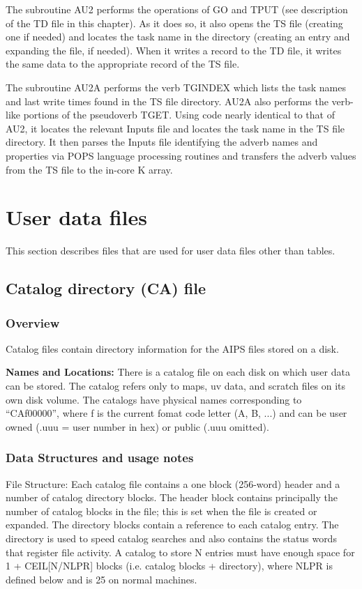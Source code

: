      The subroutine AU2 performs the operations of GO and
TPUT (see description of the TD file in this chapter).  As it does so,
it also opens the TS file (creating one if needed) and locates the
task name in the directory (creating an entry and expanding the file,
if needed).  When it writes a record to the TD file, it writes the
same data to the appropriate record of the TS file.

     The subroutine AU2A performs the verb TGINDEX which
lists the task names and last write times found in the TS file
directory.  AU2A also performs the verb-like portions of the
pseudoverb TGET.  Using code nearly identical to that of AU2, it
locates the relevant Inputs file and locates the task name in the TS
file directory.  It then parses the Inputs file identifying the adverb
names and properties via POPS language processing routines and
transfers the adverb values from the TS file to the in-core K array.
\section{User data files}
   This section describes files that are used for user data files
other than tables.

\subsection{Catalog directory (CA) file}
\subsubsection{ Overview}


  Catalog files contain directory information for the
     AIPS files stored on a disk.

{\bf Names and Locations:} There is a catalog file on each disk on
which user data can be stored.  The catalog refers only to maps, uv data,
and scratch
files on its own disk volume.  The catalogs have physical names
corresponding to ``CAf00000'', where f is the current fomat code letter
(A, B, ...) and can be user owned (.uuu = user number in hex) or
public (.uuu omitted).


\subsubsection{ Data Structures and usage notes}


     File Structure: Each catalog file contains a one block (256-word)
header and a number of catalog directory blocks.  The header block
contains principally the number of catalog blocks in the file; this is
set when the file is created or expanded.  The directory blocks
contain a reference to each catalog entry.  The directory is used to
speed catalog searches and also contains the status words that
register file activity.  A catalog to store N entries must have enough
space for 1 + CEIL[N/NLPR] blocks (i.e. catalog blocks + directory),
where NLPR is defined below and is 25 on normal machines.


